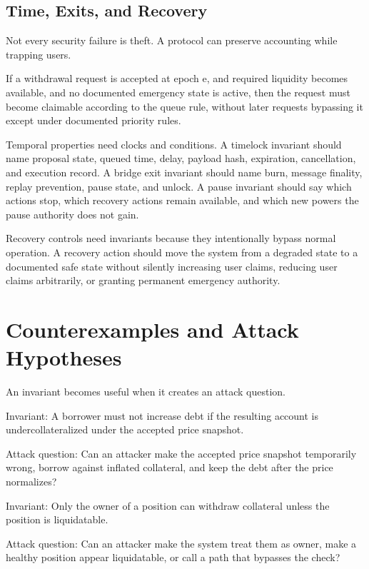 \subsection{Time, Exits, and Recovery}

Not every security failure is theft. A protocol can preserve accounting while trapping users.

\begin{codeblock}
If a withdrawal request is accepted at epoch e,
and required liquidity becomes available,
and no documented emergency state is active,
then the request must become claimable according to the queue rule,
without later requests bypassing it except under documented priority rules.
\end{codeblock}

Temporal properties need clocks and conditions. A timelock invariant should name proposal state, queued time, delay, payload hash, expiration, cancellation, and execution record. A bridge exit invariant should name burn, message finality, replay prevention, pause state, and unlock. A pause invariant should say which actions stop, which recovery actions remain available, and which new powers the pause authority does not gain.

Recovery controls need invariants because they intentionally bypass normal operation. A recovery action should move the system from a degraded state to a documented safe state without silently increasing user claims, reducing user claims arbitrarily, or granting permanent emergency authority.

\section{Counterexamples and Attack Hypotheses}

An invariant becomes useful when it creates an attack question.

\begin{codeblock}
Invariant:
    A borrower must not increase debt if the resulting account is
    undercollateralized under the accepted price snapshot.

Attack question:
    Can an attacker make the accepted price snapshot temporarily wrong,
    borrow against inflated collateral, and keep the debt after the
    price normalizes?
\end{codeblock}

\begin{codeblock}
Invariant:
    Only the owner of a position can withdraw collateral unless the
    position is liquidatable.

Attack question:
    Can an attacker make the system treat them as owner, make a healthy
    position appear liquidatable, or call a path that bypasses the check?
\end{codeblock}

